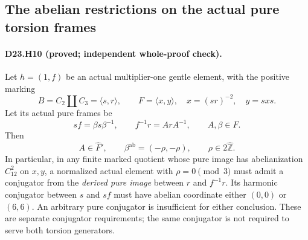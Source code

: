 \subsection{The abelian restrictions on the actual pure torsion frames}

\paragraph{D23.H10 (proved; independent whole-proof check).}
Let $h=(1,f)$ be an actual multiplier-one gentle element,
with the positive marking
\[
 B=C_2\amalg C_3=\langle s,r\rangle,\qquad
 F=\langle x,y\rangle,\quad x=(sr)^{-2},\quad y=sxs.
\]
Let its actual pure frames be
\[
       sf=\beta s\beta^{-1},\qquad
       f^{-1}r=A r A^{-1},\qquad A,\beta\in\widehat F.
\]
Then
\[
             A\in\widehat F',\qquad
       \beta^{\mathrm{ab}}=(-\rho,-\rho),\qquad
                      \rho\in2\widehat{\mathbb Z}.
\]
In particular, in any finite marked quotient whose pure
image has abelianization $C_{12}^2$ on $x,y$, a normalized
actual element with $\rho=0\pmod3$ must admit a conjugator
from the \emph{derived pure image} between $r$ and
$f^{-1}r$. Its harmonic conjugator between $s$ and $sf$
must have abelian coordinate either $(0,0)$ or $(6,6)$.
An arbitrary pure conjugator is insufficient for either
conclusion. These are separate conjugator requirements;
the same conjugator is not required to serve both torsion
generators.


